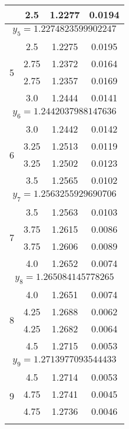 \begin{longtable}{|c|c|c|c|}
	                    & 2.5   & 1.2277 & 0.0194       \\ \hline
	\multicolumn{4}{|c|}{$y_5 = 1.2274823599902247$}    \\ \hline
	\multirow{4}{*}{5}  & 2.5   & 1.2275 & 0.0195       \\ \cline{2-4} 
	                    & 2.75  & 1.2372 & 0.0164       \\ \cline{2-4} 
	                    & 2.75  & 1.2357 & 0.0169       \\ \cline{2-4} 
	                    & 3.0   & 1.2444 & 0.0141       \\ \hline
	\multicolumn{4}{|c|}{$y_6 = 1.2442037988147636$}    \\ \hline
	\multirow{4}{*}{6}  & 3.0   & 1.2442 & 0.0142       \\ \cline{2-4} 
	                    & 3.25  & 1.2513 & 0.0119       \\ \cline{2-4} 
	                    & 3.25  & 1.2502 & 0.0123       \\ \cline{2-4} 
	                    & 3.5   & 1.2565 & 0.0102       \\ \hline
	\multicolumn{4}{|c|}{$y_7 = 1.2563255929690706$}    \\ \hline
	\multirow{4}{*}{7}  & 3.5   & 1.2563 & 0.0103       \\ \cline{2-4} 
	                    & 3.75  & 1.2615 & 0.0086       \\ \cline{2-4} 
	                    & 3.75  & 1.2606 & 0.0089       \\ \cline{2-4} 
	                    & 4.0   & 1.2652 & 0.0074       \\ \hline
	\multicolumn{4}{|c|}{$y_8 = 1.265084145778265$}     \\ \hline
	\multirow{4}{*}{8}  & 4.0   & 1.2651 & 0.0074       \\ \cline{2-4} 
	                    & 4.25  & 1.2688 & 0.0062       \\ \cline{2-4} 
	                    & 4.25  & 1.2682 & 0.0064       \\ \cline{2-4} 
	                    & 4.5   & 1.2715 & 0.0053       \\ \hline
	\multicolumn{4}{|c|}{$y_9 = 1.2713977093544433$}    \\ \hline
	\multirow{4}{*}{9}  & 4.5   & 1.2714 & 0.0053       \\ \cline{2-4} 
	                    & 4.75  & 1.2741 & 0.0045       \\ \cline{2-4} 
	                    & 4.75  & 1.2736 & 0.0046       \\ \cline{2-4} 

\end{longtable}
